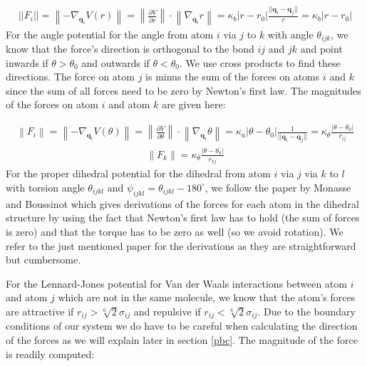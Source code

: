 \documentclass[11pt,a4paper]{article}
\begin{document}
\begin{align*}
||F_i|| = \left\|-\nabla_{\textbf{q}_i}V(r)\right\| = \left\|\frac{\partial V}{\partial r}\right\| \cdot \left\|\nabla_{\textbf{q}_i}r\right\| = \kappa_{b}| r - r_0 |\frac{||\textbf{q}_i - \textbf{q}_j||}{r} = \kappa_{b}| r - r_0 |
\end{align*}
For the angle potential for the angle from atom $i$ via $j$ to $k$ with angle $\theta_{ijk}$, we know that the force's direction is orthogonal to the bond $ij$ and $jk$ and point inwards if $\theta > \theta_0$ and outwards if $\theta < \theta_0$. We use cross products to find these directions. The force on atom $j$ is minus the sum of the forces on atoms $i$ and $k$ since the sum of all forces need to be zero by Newton's first law. The magnitudes of the forces on atom $i$ and atom $k$ are given here:

\begin{align*}
\left\|F_i\right\| = \left\|-\nabla_{\textbf{q}_i}V(\theta)\right\| = \left\|\frac{\partial V}{\partial \theta}\right\| \cdot \left\|\nabla_{\textbf{q}_i}\theta\right\| = \kappa_{a}| \theta - \theta_0 | \frac{1}{||\textbf{q}_i - \textbf{q}_j||}= \kappa_{\theta}\frac{| \theta - \theta_0 |}{r_{ij}} 
\end{align*}
\begin{align*}
\left\|F_k\right\| = \kappa_{\theta}\frac{| \theta - \theta_0 |}{r_{kj}}
\end{align*}
For the proper dihedral potential for the dihedral from atom $i$ via $j$ via $k$ to $l$ with torsion angle $\theta_{ijkl}$ and $\psi_{ijkl}= \theta_{ijkl} - 180^{\circ}$, we follow the paper by Monasse and Boussinot \cite{hal} which gives derivations of the forces for each atom in the dihedral structure by using the fact that Newton's first law has to hold (the sum of forces is zero) and that the torque has to be zero as well (so we avoid rotation). We refer to the just mentioned paper for the derivations as they are straightforward but cumbersome.

For the Lennard-Jones potential for Van der Waals interactions between atom $i$ and atom $j$ which are not in the same molecule, we know that the atom's forces are attractive if $r_{ij} > \sqrt[6]{2}\sigma_{ij}$ and repulsive if $r_{ij} < \sqrt[6]{2}\sigma_{ij}$. Due to the boundary conditions of our system we do have to be careful when calculating the direction of the forces as we will explain later in section \ref{pbc}. The magnitude of the force is readily computed:
\end{document}
